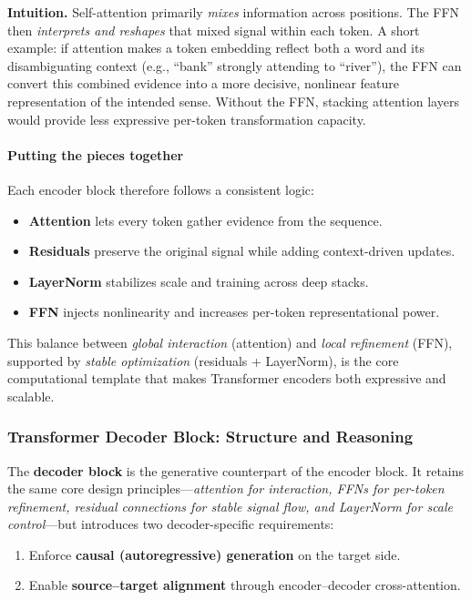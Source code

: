 \noindent
\textbf{Intuition.}
Self-attention primarily \emph{mixes} information across positions.
The FFN then \emph{interprets and reshapes} that mixed signal within each token.
A short example:
if attention makes a token embedding reflect both a word and its disambiguating context
(e.g., ``bank'' strongly attending to ``river''),
the FFN can convert this combined evidence into a more decisive,
nonlinear feature representation of the intended sense.
Without the FFN,
stacking attention layers would provide less expressive per-token transformation capacity.

\paragraph{Putting the pieces together}
\noindent
Each encoder block therefore follows a consistent logic:
\begin{itemize}
	\item \textbf{Attention} lets every token gather evidence from the sequence.
	\item \textbf{Residuals} preserve the original signal while adding context-driven updates.
	\item \textbf{LayerNorm} stabilizes scale and training across deep stacks.
	\item \textbf{FFN} injects nonlinearity and increases per-token representational power.
\end{itemize}

\noindent
This balance between \emph{global interaction} (attention)
and \emph{local refinement} (FFN),
supported by \emph{stable optimization} (residuals + LayerNorm),
is the core computational template that makes Transformer encoders
both expressive and scalable.

\subsubsection{Transformer Decoder Block: Structure and Reasoning}

\noindent
The \textbf{decoder block} is the generative counterpart of the encoder block.
It retains the same core design principles---\emph{attention for interaction, FFNs for per-token refinement, residual connections for stable signal flow, and LayerNorm for scale control}---but introduces two decoder-specific requirements:
\begin{enumerate}
	\item Enforce \textbf{causal (autoregressive) generation} on the target side.
	\item Enable \textbf{source--target alignment} through encoder--decoder cross-attention.
\end{enumerate}

